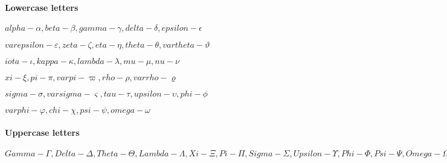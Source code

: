 \documentclass{article}[20200304]
\begin{document}
\paragraph{Lowercase letters}
\(alpha-\alpha, beta-\beta, gamma-\gamma, delta-\delta, epsilon-\epsilon\)

\(varepsilon-\varepsilon, zeta-\zeta, eta-\eta, theta- \theta, vartheta-\vartheta\)

\(iota-\iota, kappa-\kappa, lambda-\lambda, mu-\mu, nu-\nu\)

\(xi-\xi, pi-\pi, varpi-\varpi, rho-\rho, varrho-\varrho\)

\(sigma-\sigma, varsigma-\varsigma, tau-\tau, upsilon-\upsilon, phi-\phi\)

\(varphi-\varphi, chi-\chi, psi-\psi, omega-\omega\)

\paragraph{Uppercase letters}
\(Gamma-\Gamma, Delta-\Delta, Theta-\Theta, Lambda-\Lambda, Xi-\Xi, Pi-\Pi, Sigma-\Sigma, Upsilon-\Upsilon, Phi-\Phi, Psi-\Psi, Omega-\Omega\)
\end{document}
